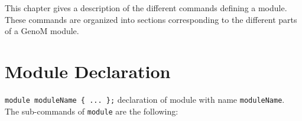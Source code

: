 %
%
%
%
%
%

This chapter gives a description of the different commands defining
a {\GenoM} module. These commands are organized into sections
corresponding to the different parts of a GenoM module.

\section{Module Declaration}
\label{sec|declaration}

\noindent
\texttt{module moduleName \{ ... \};} declaration of module with name
\texttt{moduleName}. \\

\noindent
The sub-commands of \texttt{module} are the following:

